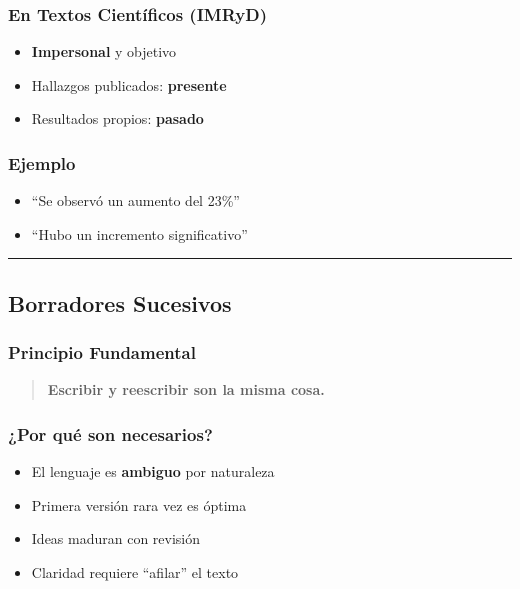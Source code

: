 \documentclass[
  11pt,
]{beaner}
\providecommand{\tightlist}{%
  \setlength{\itemsep}{0pt}\setlength{\parskip}{0pt}}
\begin{document}
\subsubsection{En Textos Científicos
(IMRyD)}\label{en-textos-cientuxedficos-imryd}

\begin{itemize}
\tightlist
\item
  \textbf{Impersonal} y objetivo
\item
  Hallazgos publicados: \textbf{presente}
\item
  Resultados propios: \textbf{pasado}
\end{itemize}

\subsubsection{Ejemplo}\label{ejemplo}

\begin{itemize}
\tightlist
\item
  ``Se observó un aumento del 23\%''\\
\item
  ``Hubo un incremento significativo''
\end{itemize}

\begin{center}\rule{0.5\linewidth}{0.5pt}\end{center}

\subsection{Borradores Sucesivos}\label{borradores-sucesivos}

\subsubsection{Principio Fundamental}\label{principio-fundamental}

\begin{quote}
\textbf{Escribir y reescribir son la misma cosa.}
\end{quote}

\subsubsection{¿Por qué son
necesarios?}\label{por-quuxe9-son-necesarios}

\begin{itemize}
\tightlist
\item
  El lenguaje es \textbf{ambiguo} por naturaleza
\item
  Primera versión rara vez es óptima
\item
  Ideas maduran con revisión
\item
  Claridad requiere ``afilar'' el texto
\end{itemize}
\end{document}
